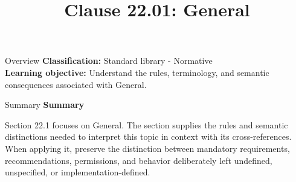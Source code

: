 \documentclass[10pt,letterpaper]{article}
\title{Clause 22.01: General}
\author{}
\date{}
\begin{document}
\maketitle
\begin{CornellOverviewBox}{Overview}
\textbf{Classification:} Standard library - Normative\\[2pt]
\textbf{Learning objective:} Understand the rules, terminology, and semantic consequences associated with General.
\end{CornellOverviewBox}\begin{CornellSummaryBox}{Summary}
{\sffamily\bfseries\color{Accent} Summary}\par\vspace{3pt}Section 22.1 focuses on General. The section supplies the rules and semantic distinctions needed to interpret this topic in context with its cross-references. When applying it, preserve the distinction between mandatory requirements, recommendations, permissions, and behavior deliberately left undefined, unspecified, or implementation-defined.
\end{CornellSummaryBox}
\end{document}
